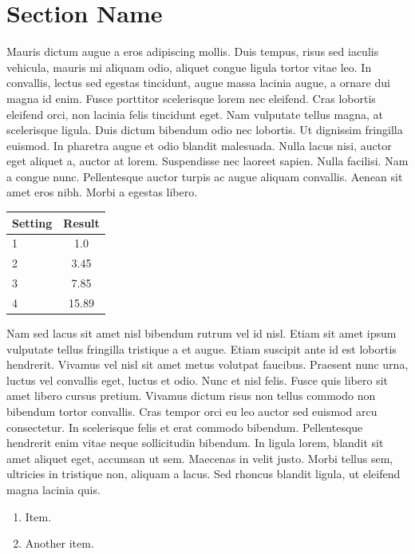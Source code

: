 \documentclass[fleqn,11pt]{article}
\begin{document}
\section{Section Name}

Mauris dictum augue a eros adipiscing mollis. Duis tempus, risus sed
iaculis vehicula, mauris mi aliquam odio, aliquet congue ligula tortor
vitae leo. In convallis, lectus sed egestas tincidunt, augue massa
lacinia augue, a ornare dui magna id enim. Fusce porttitor scelerisque
lorem nec eleifend. Cras lobortis eleifend orci, non lacinia felis
tincidunt eget. Nam vulputate tellus magna, at scelerisque
ligula. Duis dictum bibendum odio nec lobortis. Ut dignissim fringilla
euismod. In pharetra augue et odio blandit malesuada. Nulla lacus
nisi, auctor eget aliquet a, auctor at lorem. Suspendisse nec laoreet
sapien. Nulla facilisi. Nam a congue nunc. Pellentesque auctor turpis
ac augue aliquam convallis. Aenean sit amet eros nibh. Morbi a egestas
libero.

\vspace{0.5cm}
\begin{tabular}{lc}
  \toprule
  Setting & Result\\
  \midrule
  1 & 1.0\\
  2 & 3.45\\
  3 & 7.85\\
  4 & 15.89\\
  \bottomrule
\end{tabular}
\vspace{0.5cm}

Nam sed lacus sit amet nisl bibendum rutrum vel id nisl. Etiam sit
amet ipsum vulputate tellus fringilla tristique a et augue. Etiam
suscipit ante id est lobortis hendrerit. Vivamus vel nisl sit amet
metus volutpat faucibus. Praesent nunc urna, luctus vel convallis
eget, luctus et odio. Nunc et nisl felis. Fusce quis libero sit amet
libero cursus pretium. Vivamus dictum risus non tellus commodo non
bibendum tortor convallis. Cras tempor orci eu leo auctor sed euismod
arcu consectetur. In scelerisque felis et erat commodo
bibendum. Pellentesque hendrerit enim vitae neque sollicitudin
bibendum. In ligula lorem, blandit sit amet aliquet eget, accumsan ut
sem. Maecenas in velit justo. Morbi tellus sem, ultricies in tristique
non, aliquam a lacus. Sed rhoncus blandit ligula, ut eleifend magna
lacinia quis.

\begin{enumerate}

\item Item.

\item Another item.

\end{enumerate}
\end{document}
